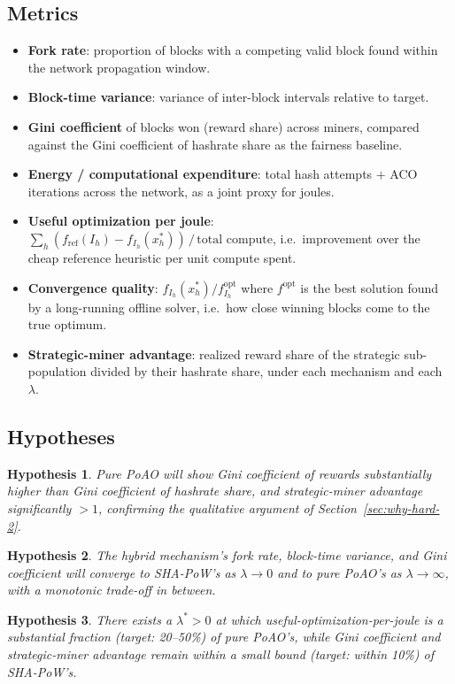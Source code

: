 \documentclass[journal]{IEEEtran}
\newtheorem{hypothesis}{Hypothesis}
\begin{document}
\subsection{Metrics}
\begin{itemize}[nosep]
\item \textbf{Fork rate}: proportion of blocks with a competing valid block
found within the network propagation window.
\item \textbf{Block-time variance}: variance of inter-block intervals relative
to target.
\item \textbf{Gini coefficient} of blocks won (reward share) across miners,
compared against the Gini coefficient of hashrate share as the fairness
baseline.
\item \textbf{Energy / computational expenditure}: total hash attempts $+$ ACO
iterations across the network, as a joint proxy for joules.
\item \textbf{Useful optimization per joule}: $\sum_h (f_{\text{ref}}(I_h) -
f_{I_h}(x_h^\ast)) \,/\, \text{total compute}$, i.e.\ improvement over the
cheap reference heuristic per unit compute spent.
\item \textbf{Convergence quality}: $f_{I_h}(x_h^\ast) / f_{I_h}^{\text{opt}}$
where $f^{\text{opt}}$ is the best solution found by a long-running offline
solver, i.e.\ how close winning blocks come to the true optimum.
\item \textbf{Strategic-miner advantage}: realized reward share of the
strategic sub-population divided by their hashrate share, under each
mechanism and each $\lambda$.
\end{itemize}

\subsection{Hypotheses}
\begin{hypothesis}
Pure PoAO will show Gini coefficient of rewards substantially higher than
Gini coefficient of hashrate share, and strategic-miner advantage
significantly $> 1$, confirming the qualitative argument of
Section~\ref{sec:why-hard-2}.
\end{hypothesis}
\begin{hypothesis}
The hybrid mechanism's fork rate, block-time variance, and Gini coefficient
will converge to SHA-PoW's as $\lambda \to 0$ and to pure PoAO's as
$\lambda \to \infty$, with a monotonic trade-off in between.
\end{hypothesis}
\begin{hypothesis}
There exists a $\lambda^\ast > 0$ at which useful-optimization-per-joule is a
substantial fraction (target: 20--50\%) of pure PoAO's, while Gini
coefficient and strategic-miner advantage remain within a small bound
(target: within 10\%) of SHA-PoW's.
\end{hypothesis}
\end{document}
